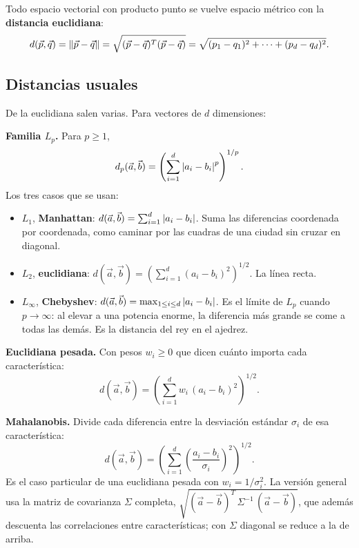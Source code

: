 \documentclass[11pt,letterpaper]{article}
\begin{document}
Todo espacio vectorial con producto punto se vuelve espacio métrico
con la \textbf{distancia euclidiana}:
\[
    d(\vec{p}, \vec{q}) = \left\lVert \vec{p} - \vec{q} \right\rVert
    = \sqrt{(\vec{p} - \vec{q})^{T}(\vec{p} - \vec{q})}
    = \sqrt{(p_1 - q_1)^2 + \cdots + (p_d - q_d)^2} .
\]


\subsection*{Distancias usuales}

De la euclidiana salen varias. Para vectores de $d$ dimensiones:

\textbf{Familia $L_p$.} Para $p \geq 1$,
\[
    d_p(\vec{a}, \vec{b}) = \left( \sum_{i=1}^{d} \left\lvert a_i - b_i \right\rvert^p
    \right)^{1/p} .
\]
Los tres casos que se usan:
\begin{itemize}[itemsep=0.3em]
    \item $L_1$, \textbf{Manhattan}:
          $d(\vec{a}, \vec{b}) = \sum_{i=1}^{d} \left\lvert a_i - b_i \right\rvert$.
          Suma las diferencias coordenada por coordenada, como caminar
          por las cuadras de una ciudad sin cruzar en diagonal.
    \item $L_2$, \textbf{euclidiana}:
          $d(\vec{a}, \vec{b}) = \left( \sum_{i=1}^{d}
          (a_i - b_i)^2 \right)^{1/2}$. La línea recta.
    \item $L_\infty$, \textbf{Chebyshev}:
          $d(\vec{a}, \vec{b}) = \max_{1 \leq i \leq d}
          \left\lvert a_i - b_i \right\rvert$. Es el límite de $L_p$ cuando
          $p \to \infty$: al elevar a una potencia enorme, la
          diferencia más grande se come a todas las demás. Es la
          distancia del rey en el ajedrez.
\end{itemize}

\textbf{Euclidiana pesada.} Con pesos $w_i \geq 0$ que dicen cuánto
importa cada característica:
\[
    d(\vec{a}, \vec{b}) = \left( \sum_{i=1}^{d} w_i\,(a_i - b_i)^2
    \right)^{1/2} .
\]

\textbf{Mahalanobis.} Divide cada diferencia entre la desviación
estándar $\sigma_i$ de esa característica:
\[
    d(\vec{a}, \vec{b}) = \left( \sum_{i=1}^{d}
    \left(\frac{a_i - b_i}{\sigma_i}\right)^2 \right)^{1/2} .
\]
Es el caso particular de una euclidiana pesada con
$w_i = 1 / \sigma_i^2$. La versión general usa la matriz de
covarianza $\Sigma$ completa,
$\sqrt{(\vec{a} - \vec{b})^{T}\, \Sigma^{-1}\, (\vec{a} - \vec{b})}$,
que además descuenta las correlaciones entre características; con
$\Sigma$ diagonal se reduce a la de arriba.
\end{document}

